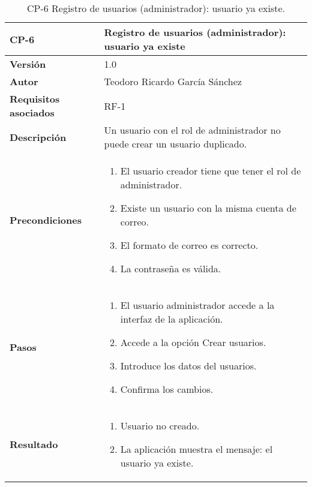 \begin{table}[p]
	\centering
	\begin{tabularx}{\linewidth}{ p{} p{} }
		\toprule
		\textbf{CP-6}    & \textbf{Registro de usuarios (administrador): usuario ya existe}\\
		\toprule
		\textbf{Versión}              & 1.0    \\
		\textbf{Autor}                & Teodoro Ricardo García Sánchez \\
		\textbf{Requisitos asociados} & RF-1 \\
		\textbf{Descripción}          & Un usuario con el rol de administrador no puede crear un usuario duplicado. \\
		\textbf{Precondiciones}         & 
		\begin{enumerate}
			\def\labelenumi{\arabic{enumi}.}
			\tightlist
			\item El usuario creador tiene que tener el rol de administrador.
			\item Existe un usuario con la misma cuenta de correo.
			\item El formato de correo es correcto.
			\item La contraseña es válida.
		\end{enumerate}\\
		\textbf{Pasos}             &
		\begin{enumerate}
			\def\labelenumi{\arabic{enumi}.}
			\tightlist
			\item El usuario administrador accede a la interfaz de la aplicación.
			\item Accede a la opción Crear usuarios.
			\item Introduce los datos del usuarios.
			\item Confirma los cambios.
		\end{enumerate}\\
		\textbf{Resultado}          & 
		\begin{enumerate}
			\item Usuario no creado.
			\item La aplicación muestra el mensaje: el usuario ya existe.
		\end{enumerate}\\
		\bottomrule
	\end{tabularx}
	\caption{CP-6 Registro de usuarios (administrador): usuario ya existe.}
\end{table}

